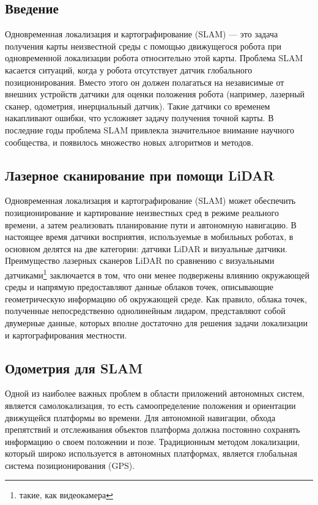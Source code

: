 \documentclass[12pt,a4paper]{scrartcl}
\begin{document}
			\subsection{Введение}
				Одновременная локализация и картографирование (SLAM) — это задача получения карты неизвестной среды с помощью движущегося робота при одновременной локализации робота относительно этой карты. Проблема SLAM касается ситуаций, когда у робота отсутствует датчик глобального позиционирования. Вместо этого он должен полагаться на независимые от внешних устройств датчики для оценки положения робота (например, лазерный сканер, одометрия, инерциальный датчик). Такие датчики со временем накапливают ошибки, что усложняет задачу получения точной карты. В последние годы проблема SLAM привлекла значительное внимание научного сообщества, и появилось множество новых алгоритмов и методов\cite{bib:Thrun2004SimultaneousLA}.
			\subsection{Лазерное сканирование при помощи LiDAR}
				Одновременная локализация и картографирование (SLAM) может обеспечить позиционирование и картирование неизвестных сред в режиме реального времени, а затем реализовать планирование пути и автономную навигацию. В настоящее время датчики восприятия, используемые в мобильных роботах, в основном делятся на две категории: датчики LiDAR и визуальные датчики. Преимущество лазерных сканеров LiDAR по сравнению с визуальными датчиками\footnote{такие, как видеокамера} заключается в том, что они менее подвержены влиянию окружающей среды и напрямую предоставляют данные облаков точек, описывающие геометрическую информацию об окружающей среде. Как правило, облака точек, полученные непосредственно однолинейным лидаром, представляют собой двумерные данные, которых вполне достаточно для решения задачи локализации и картографирования местности\cite{bib:TrajOptimizeLidarSLAM}.
			\subsection{Одометрия для SLAM}
				Одной из наиболее важных проблем в области приложений автономных систем, является самолокализация, то есть самоопределение положения и ориентации движущейся платформы во времени. Для автономной навигации, обхода препятствий и отслеживания объектов платформа должна постоянно сохранять информацию о своем положении и позе. Традиционным методом локализации, который широко используется в автономных платформах, является глобальная система позиционирования (GPS). 
				
\end{document}
